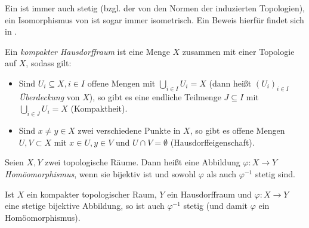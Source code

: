 \begin{bem}
Ein \CAlgHom{} ist immer auch stetig (bzgl. der von den Normen der \CAlgn{} induzierten Topologien), ein Isomorphismus von \CAlgn{} ist sogar immer isometrisch. Ein Beweis hierfür findet sich in  \cite[Korollare 2.1.19 \& 2.1.20]{Baer2003}.
\end{bem}


\begin{defn}
Ein \emph{kompakter Hausdorffraum} ist eine Menge $X$ zusammen mit einer Topologie auf $X$, sodass gilt:
\begin{itemize}
	\item Sind $U_i \subseteq X, i \in I$ offene Mengen mit $\bigcup_{i\in I} U_i = X$ (dann heißt $(U_i)_{i \in I}$ \emph{Überdeckung} von $X$), so gibt es eine endliche Teilmenge $J \subseteq I$ mit $\bigcup_{i\in J} U_i = X$ (Kompaktheit).
	\item Sind $x \neq y \in X$ zwei verschiedene Punkte in $X$, so gibt es offene Mengen $U,V \subset X$ mit $x \in U, y \in V$ und $U \cap V = \emptyset$ (Hausdorffeigenschaft).
\end{itemize}
\end{defn}

\begin{defn}[Homöomorphismus]
Seien $X, Y$ zwei topologische Räume. Dann heißt eine Abbildung $\varphi: X \to Y$ \emph{Homöomorphismus}, wenn sie bijektiv ist und sowohl $\varphi$ als auch $\varphi^{-1}$ stetig sind.
\end{defn}

\begin{lemma}\label{lemma:komHDHomoeo}
Ist $X$ ein kompakter topologischer Raum, $Y$ ein Hausdorffraum und $\varphi: X \to Y$ eine stetige bijektive Abbildung, so ist auch $\varphi^{-1}$ stetig (und damit $\varphi$ ein Homöomorphismus).
\end{lemma}

